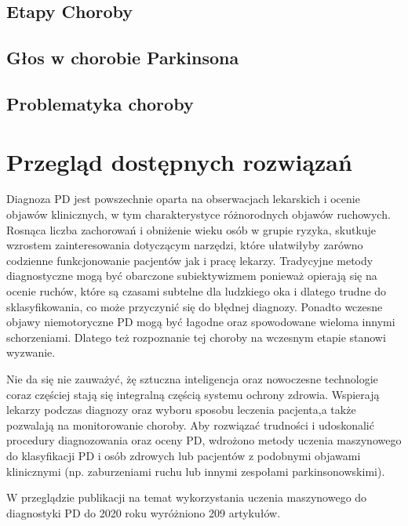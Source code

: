 \subsection{Etapy Choroby}
\label{subsec:etapypd}


\subsection{Głos w chorobie Parkinsona}
\label{subsec:gospd}


\subsection{Problematyka choroby}
\label{subsec:problematykapd}



\section{Przegląd dostępnych rozwiązań}
\label{sec:przeglad}

Diagnoza PD jest powszechnie oparta na obserwacjach lekarskich i ocenie objawów klinicznych, w tym charakterystyce różnorodnych objawów ruchowych.
Rosnąca liczba zachorowań i obniżenie wieku osób w grupie ryzyka, skutkuje wzrostem zainteresowania dotyczącym narzędzi, które ułatwiłyby
zarówno codzienne funkcjonowanie pacjentów jak i pracę lekarzy.
Tradycyjne metody diagnostyczne mogą być obarczone subiektywizmem ponieważ opierają się na ocenie ruchów, które są czasami subtelne dla
ludzkiego oka i dlatego trudne do sklasyfikowania, co może przyczynić się do błędnej diagnozy.
Ponadto wczesne objawy niemotoryczne PD mogą być łagodne oraz spowodowane wieloma innymi schorzeniami.
Dlatego też rozpoznanie tej choroby na wczesnym etapie stanowi wyzwanie.

Nie da się nie zauważyć, żę sztuczna inteligencja oraz nowoczesne technologie coraz częściej stają się integralną częścią systemu ochrony zdrowia.
Wspierają lekarzy podczas diagnozy oraz wyboru sposobu leczenia pacjenta,a także pozwalają na monitorowanie choroby.
Aby rozwiązać trudności i udoskonalić procedury diagnozowania oraz oceny PD, wdrożono metody uczenia maszynowego do klasyfikacji PD i osób zdrowych lub
pacjentów z podobnymi objawami klinicznymi (np. zaburzeniami ruchu lub innymi zespołami parkinsonowskimi).


W przeglądzie publikacji na temat wykorzystania uczenia maszynowego do diagnostyki PD do 2020 roku wyróżniono 209 artykułów\cite{ML_for_PD_review}.


